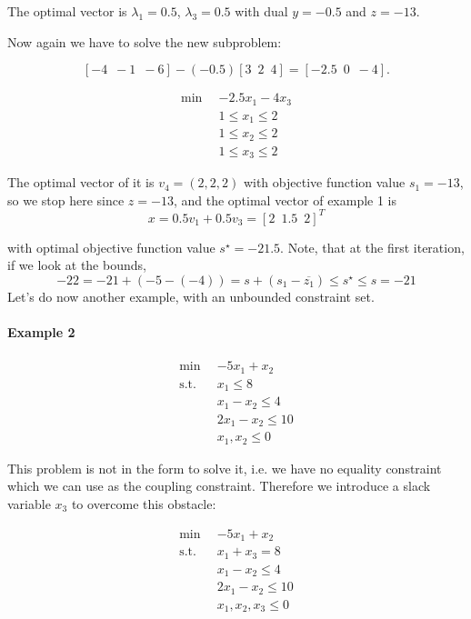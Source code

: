 \documentclass[a4paper,12pt]{article}
\begin{document}
The optimal vector is $\lambda_1 = 0.5$, $\lambda_3 = 0.5$ with dual $y = -0.5$ and $z = -13$.

Now again we have to solve the new subproblem:

\[
[-4 \enspace -1 \enspace -6] - (-0.5) [3 \enspace 2 \enspace 4] = [-2.5 \enspace 0 \enspace -4].
\]

\begin{align*}
\min \enspace &  -2.5x_1  - 4x_3  \\
& 1 \leq x_1  \leq 2 \\ 
& 1 \leq x_2  \leq 2 \\
& 1 \leq x_3  \leq 2 
\end{align*}

The optimal vector of it is $v_4 = (2,2,2)$ with objective function value $s_1 = -13$, so we stop here since $z = -13$, and the optimal vector of example 1 is
\[
 x = 0.5v_1+0.5v_3 = [2 \enspace 1.5 \enspace 2]^T
\]

with optimal objective function value $s^\star = -21.5$. Note, that at the first iteration, if we look at the bounds, 
\[
-22 = -21 + (-5-(-4))= s + (s_1 - \overline{z_1})  \leq s^\star \leq s = -21
\]
Let's do now another example, with an unbounded constraint set.

\paragraph*{Example 2}

\begin{align*}
\min \enspace & -5x_1 + x_2 \\
\text{s.t.} \enspace & x_1 \leq 8 \\
& x_1 - x_2 \leq 4 \\
& 2x_1 - x_2 \leq 10 \\
& x_1 , x_2 \leq 0
\end{align*}

This problem is not in the form to solve it, i.e. we have no equality constraint which we can use as the coupling constraint. Therefore we introduce a slack variable $x_3$ to overcome this obstacle:

\begin{align}
\min \enspace & -5x_1 + x_2 \\
\text{s.t.} \enspace & x_1 + x_3 = 8 \\
& x_1 - x_2 \leq 4 \label{eq:ex2con1}\\
& 2x_1 - x_2 \leq 10 \label{eq:ex2con2}\\
& x_1 , x_2 , x_3 \leq 0
\end{align}
\end{document}
